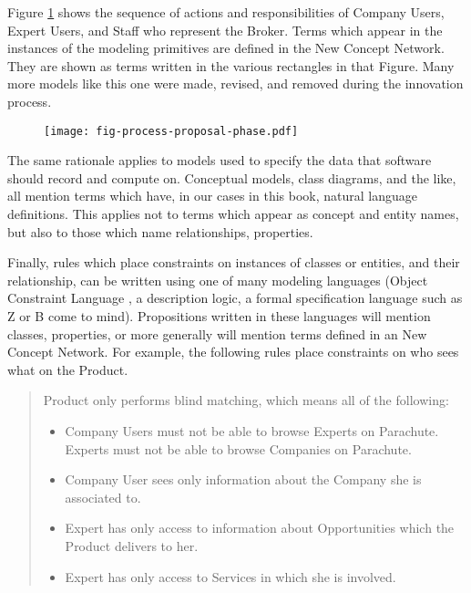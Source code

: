 \documentclass[graybox,envcountchap,sectrefs]{svmono}
\newcommand{\ncnf}{New Concept Network}
\newcommand{\nterm}[1]{\textsf{#1}}
\begin{document}
Figure \ref{fig-process-proposal-phase} shows the sequence of actions and responsibilities of \nterm{Company Users}, \nterm{Expert Users}, and \nterm{Staff} who represent the \nterm{Broker}. Terms which appear in the instances of the modeling primitives are defined in the \ncnf. They are shown as terms written in the various rectangles in that Figure. Many more models like this one were made, revised, and removed during the innovation process.

\begin{figure}[h]
	\centering
	\texttt{[image: fig-process-proposal-phase.pdf]}
	\caption{}
	\label{fig-process-proposal-phase}
\end{figure}

The same rationale applies to models used to specify the data that software should record and compute on. Conceptual models, class diagrams, and the like, all mention terms which have, in our cases in this book, natural language definitions. This applies not to terms which appear as concept and entity names, but also to those which name relationships, properties. 

Finally, rules which place constraints on instances of classes or entities, and their relationship, can be written using one of many modeling languages (Object Constraint Language \cite{}, a description logic, a formal specification language such as Z or B come to mind). Propositions written in these languages will mention classes, properties, or more generally will mention terms defined in an \ncnf. For example, the following rules place constraints on who sees what on the \nterm{Product}.

\begin{quote}
Product only performs blind matching, which means all of the following:
\begin{itemize}
	\item Company Users must not be able to browse Experts on Parachute.
	Experts must not be able to browse Companies on Parachute.
	\item Company User sees only information about the Company she is associated to.
	\item Expert has only access to information about Opportunities which the Product delivers to her.
	\item Expert has only access to Services in which she is involved. 
\end{itemize}
\end{quote}
\end{document}
